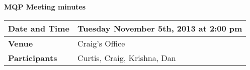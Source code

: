 \documentclass[a4wide,10pt]{extarticle}
\begin{document}
\thispagestyle{empty}

\begin{center}
\textbf{MQP Meeting minutes}
\vspace{0.33cm}
\end{center}

\begin{center}
\begin{tabular}{| m{2.8cm} | m{13.6cm} |} \hline
\textbf{Date and Time} & Tuesday November 5th, 2013 at 2:00 pm \\ \hline
\textbf{Venue} & Craig's Office \\ \hline
\textbf{Participants} & Curtis, Craig, Krishna, Dan\\ \hline
\end{tabular}
\end{center}
\end{document}
